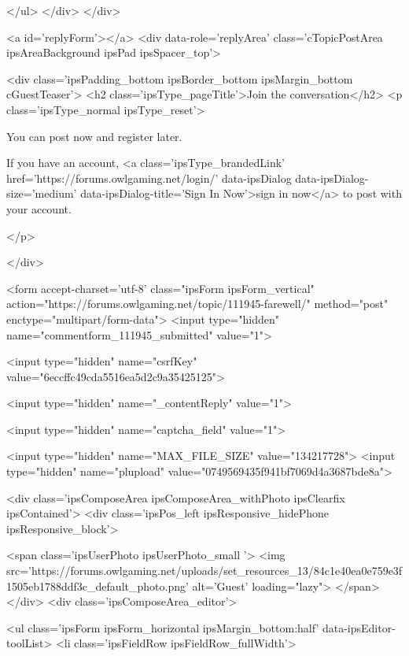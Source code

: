 		
	</ul>
</div>
		</div>
	

	
		<a id='replyForm'></a>
		<div data-role='replyArea' class='cTopicPostArea ipsAreaBackground ipsPad  ipsSpacer_top'>
			
				
				

	
		<div class='ipsPadding_bottom ipsBorder_bottom ipsMargin_bottom cGuestTeaser'>
			<h2 class='ipsType_pageTitle'>Join the conversation</h2>
			<p class='ipsType_normal ipsType_reset'>
	
				
					You can post now and register later.
				
				If you have an account, <a class='ipsType_brandedLink' href='https://forums.owlgaming.net/login/' data-ipsDialog data-ipsDialog-size='medium' data-ipsDialog-title='Sign In Now'>sign in now</a> to post with your account.
				
			</p>
	
		</div>
	


<form accept-charset='utf-8' class="ipsForm ipsForm_vertical" action="https://forums.owlgaming.net/topic/111945-farewell/" method="post" enctype="multipart/form-data">
	<input type="hidden" name="commentform_111945_submitted" value="1">
	
		<input type="hidden" name="csrfKey" value="6eccffc49cda5516ea5d2c9a35425125">
	
		<input type="hidden" name="_contentReply" value="1">
	
		<input type="hidden" name="captcha_field" value="1">
	
	
		<input type="hidden" name="MAX_FILE_SIZE" value="134217728">
		<input type="hidden" name="plupload" value="0749569435f941bf7069d4a3687bde8a">
	
	<div class='ipsComposeArea ipsComposeArea_withPhoto ipsClearfix ipsContained'>
		<div class='ipsPos_left ipsResponsive_hidePhone ipsResponsive_block'>

	<span class='ipsUserPhoto ipsUserPhoto_small '>
		<img src='https://forums.owlgaming.net/uploads/set_resources_13/84c1e40ea0e759e3f1505eb1788ddf3c_default_photo.png' alt='Guest' loading="lazy">
	</span>
</div>
		<div class='ipsComposeArea_editor'>
			
				
					
				
					
						<ul class='ipsForm ipsForm_horizontal ipsMargin_bottom:half' data-ipsEditor-toolList>
							<li class='ipsFieldRow ipsFieldRow_fullWidth'>
								



